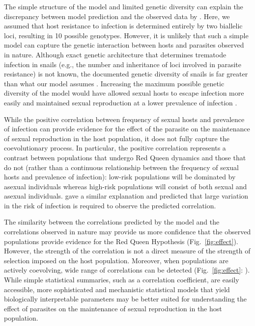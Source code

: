 \documentclass{article}\usepackage[]{graphicx}\usepackage[]{color}
\newcommand{\fref}[1]{Fig.~\ref{fig:#1}}
\begin{document}
The simple structure of the model and limited genetic diversity can explain the discrepancy between model prediction and the observed data by \cite{mckone2016fine}.
Here, we assumed that host resistance to infection is determined entirely by two biallelic loci, resulting in 10 possible genotypes.
However, it is unlikely that such a simple model can capture the genetic interaction between hosts and parasites observed in nature.
Although exact genetic architecture that determines trematode infection in snails (e.g., the number and inheritance of loci involved in parasite resistance) is not known, the documented genetic diversity of snails is far greater than what our model assumes \citep{fox1996genetic, king2011parasites, dagan2013clonal}.
Increasing the maximum possible genetic diversity of the model would have allowed sexual hosts to escape infection more easily and maintained sexual reproduction at a lower prevalence of infection \citep{lively2010effect, king2012does, ashby2015diversity}.

While the positive correlation between frequency of sexual hosts and prevalence of infection can provide evidence for the effect of the parasite on the maintenance of sexual reproduction in the host population, it does not fully capture the coevolutionary process.
In particular, the positive correlation represents a contrast between populations that undergo Red Queen dynamics and those that do not (rather than a continuous relationship between the frequency of sexual hosts and prevalence of infection):
low-risk populations will be dominated by asexual individuals whereas high-risk populations will consist of both sexual and asexual individuals.
\cite{lively2001trematode} gave a similar explanation and predicted that large variation in the risk of infection is required to observe the predicted correlation.

The similarity between the correlations predicted by the model and the correlations observed in nature may provide us more confidence that the observed populations provide evidence for the Red Queen Hypothesis (\fref{effect}).
However, the strength of the correlation is not a direct measure of the strength of selection imposed on the host population.
Moreover, when populations are actively coevolving, wide range of correlations can be detected (\fref{effect}: \cite{vergara2014infection}).
While simple statistical summaries, such as a correlation coefficient, are easily accessible,
more sophisticated and mechanistic statistical models that yield biologically interpretable parameters may be better suited for understanding the effect of parasites on the maintenance of sexual reproduction in the host population.
\end{document}
